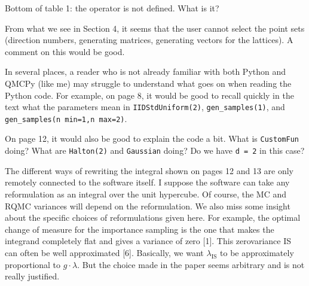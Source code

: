 \documentclass{amsart}
\begin{document}
\vspace{1cm}

Bottom of table 1: the 	 operator is not defined. What is it?

\vspace{1cm}

From what we see in Section 4, it seems that the user cannot select the point sets (direction numbers, generating matrices, generating vectors for the lattices). A comment on this would be good. 

\vspace{1cm}

In several places, a reader who is not already familiar with both Python and QMCPy (like me) may struggle to understand what goes on when reading the Python code. For example, on page 8, it would be good to recall quickly in the text what the parameters mean in \texttt{IIDStdUniform(2)}, \texttt{gen\_samples(1)}, and \texttt{gen\_samples(n min=1,n max=2)}.

\vspace{1cm}

On page 12, it would also be good to explain the code a bit. What is \texttt{CustomFun} doing? What are \texttt{Halton(2)} and \texttt{Gaussian} doing? Do we have \texttt{d = 2} in this case?

\vspace{1cm}

The different ways of rewriting the integral shown on pages 12 and 13 are only remotely connected to the software itself. I suppose the software can take any reformulation as an integral over the unit hypercube. Of course, the MC and RQMC variances will depend on the reformulation. We also miss some insight about the specific choices of reformulations given here. For example, the optimal change of measure for the importance sampling is the one that makes the integrand completely flat and gives a variance of zero [1]. This zerovariance IS can often be well approximated [6]. Basically, we want $\lambda_\text{IS}$ to be approximately proportional to $g \cdot \lambda$. But the choice made in the paper seems arbitrary and is not really justified.
\end{document}

